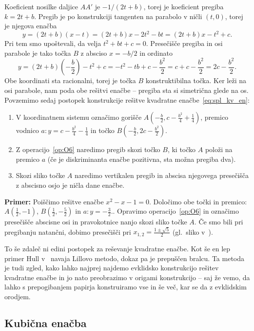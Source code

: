 Koeficient nosilke daljice $AA'$ je $ - 1/(2t + b)$, torej je koeficient pregiba $k = 2t + b$. Pregib je po konstrukciji tangenten na parabolo v ničli $(t, 0)$, torej je njegova enačba
$$ y = (2t + b)(x - t) = (2t + b)x - 2t^2 - bt = (2t + b)x - t^2 + c. $$
Pri tem smo upoštevali, da velja $t^2 + bt + c = 0$. Presečišče pregiba in osi parabole je tako točka $B$ z absciso $ x = -b/2 $ in ordinato
$$ y = (2t + b)\left(-\frac{b}{2}\right) - t^2 + c = - t^2 - tb + c - \frac{b^2}{2} = c + c - \frac{b^2}{2} = 2c - \frac{b^2}{2}.$$
Obe koordinati sta racionalni, torej je točka $B$ konstruktibilna točka. Ker leži na osi parabole, nam poda obe rešitvi enačbe -- pregiba sta si simetrična glede na os. Povzemimo sedaj postopek konstrukcije rešitve kvadratne enačbe~\ref{eq:spl_kv_en}:
\begin{enumerate}
    \item V koordinatnem sistemu označimo gorišče $A\left(-\frac{b}{2}, c - \frac{b^2}{4} + \frac{1}{4}\right)$, premico vodnico $a: y = c - \frac{b^2}{4} - \frac{1}{4}$ in točko $B(-\frac{b}{2}, 2c - \frac{b^2}{2})$.
    \item Z operacijo~\ref{op:O6} naredimo pregib skozi točko $B$, ki točko $A$ položi na premico $a$ (če je diskriminanta enačbe pozitivna, sta možna pregiba dva).
    \item Skozi sliko točke $A$ naredimo vertikalen pregib in abscisa njegovega presečišča z abscisno osjo je ničla dane enačbe.
\end{enumerate}

\textbf{Primer:} Poiščimo rešitve enačbe $x^2 - x - 1 = 0$. Določimo obe točki in premico: $A(\frac{1}{2}, -1)$, $B(\frac{1}{2}, -\frac{5}{2})$ in $a: y = -\frac{3}{2}.$. Opravimo operacijo~\ref{op:O6} in označimo presečišče abscisne osi in pravokotnice nanjo skozi sliko točke $A$. Če smo bili pri pregibanju natančni, dobimo presečišči pri $x_{1,2} = \frac{1 \pm \sqrt{5}}{2}$ (gl.\ sliko v~\cite[str.\ 37]{hull2020}).

To še zdaleč ni edini postopek za reševanje kvadratne enačbe. Kot še en lep primer Hull v~\cite[str.\ 38]{hull2020} navaja Lillovo metodo, dokaz pa je prepuščen bralcu. Ta metoda je tudi zgled, kako lahko najprej najdemo evklidsko konstrukcijo rešitev kvadratne enačbe in jo nato preobrazimo v origami konstrukcijo -- saj že vemo, da lahko s prepogibanjem papirja konstruiramo vse in še več, kar se da z evklidskim orodjem.

\subsection{Kubična enačba}
\label{podpogl:kubicna_enacba}

